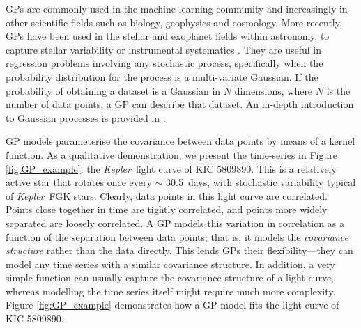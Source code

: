 \documentclass[useAMS, usenatbib, preprint, 12pt]{aastex}
\newcommand{\Kepler}{{\it Kepler}}
\newcommand{\kepler}{\Kepler}
\newcommand{\eg}{{\it e.g.}}
\newcommand{\kepexample}{5809890}
\newcommand{\kepexampleperiod}{30.5}
\begin{document}
GPs are commonly used in the machine learning community and increasingly
in other scientific fields such as biology, geophysics and cosmology.
More recently, GPs have been used in the stellar and exoplanet fields within
astronomy, to capture stellar variability or instrumental systematics
\citep[see \eg][]{Gibson2012, Haywood2014, Dawson2014, Barclay2015,
Haywood2015, Evans2015, Rajpaul2015, Rajpaul2016, Aigrain2016}.
They are useful in regression problems involving any stochastic process,
specifically when the probability distribution for the process is a
multi-variate Gaussian.
If the probability of obtaining a dataset is a Gaussian in $N$ dimensions,
where $N$ is the number of data points, a GP can describe that dataset.
An in-depth introduction to Gaussian processes is provided in
\citet{Rasmussen2005}.

GP models parameterise the covariance between data points by means of a
kernel function.
As a qualitative demonstration, we present the time-series in Figure
\ref{fig:GP_example}: the \kepler\ light curve of KIC \kepexample.
This is a relatively active star that rotates once every $\sim$
\kepexampleperiod\ days, with stochastic variability typical of \kepler\ FGK
stars.
Clearly, data points in this light curve are correlated.
Points close together in time are tightly correlated, and points more
widely separated are loosely correlated.
A GP models this variation in correlation as a function of the separation
between data points; that is, it models the {\it covariance structure} rather
than the data directly.
This lends GPs their flexibility---they can model any time
series with a similar covariance structure.
In addition, a very simple function can usually capture the covariance
structure of a light curve, whereas modelling the time series itself
might require much more complexity.
Figure \ref{fig:GP_example} demonstrates how a GP model fits the light curve of
KIC \kepexample.
\end{document}
